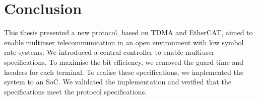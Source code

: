 ﻿\documentclass[twocolumn,9pt]{ltjsarticle}
\begin{document}
\section{Conclusion}
This thesis presented a new protocol, based on TDMA and EtherCAT, aimed to enable multiuser telecommunication in an open environment with low symbol rate systems.
We introduced a central controller to enable multiuser specifications.
To maximise the bit efficiency, we removed the guard time and headers for each terminal.
To realise these specifications, we implemented the system to an SoC.
We validated the implementation and verified that the specifications meet the protocol specifications.
\end{document}
